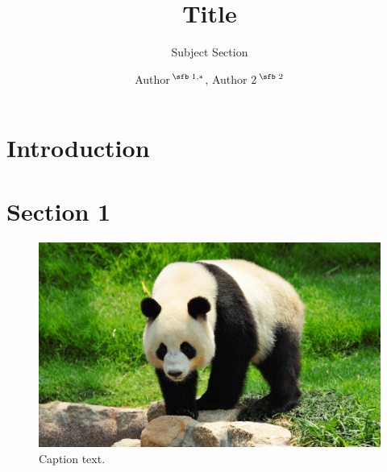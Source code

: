 \documentclass{bioinfo}
\begin{document}


\subtitle{Subject Section}

\title[Title]{Title}
\author[Sample \textit{et~al}.]{Author\,$^{\text{\sfb 1,}*}$, Author 2\,$^{\text{\sfb 2}}$}
\address{$^{\text{\sf 1}}$Address, \\
$^{\text{\sf 2}}$Address 2}




\abstract{\blindtext}

\maketitle

\section{Introduction}

\blindtext

\section{Section 1}

\blindtext

\begin{figure}[!tpb]
\centerline{\includegraphics[width=\columnwidth]{panda.jpg}}
\caption{Caption text. 
\label{panda}}
\end{figure}
\end{document}
